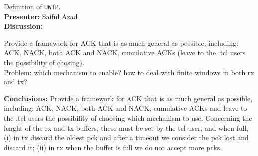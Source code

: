 \documentclass[11pt,journal,draftclsnofoot,onecolumn,twoside,letterpaper]{IEEEtran}
\theoremstyle{definition} \newtheorem{definition}[]{Definition}
\theoremstyle{theorem} \newtheorem{theorem}[]{Theorem}
\begin{document}
 Definition of {\tt UWTP}.\\
{\bf Presenter:} Saiful Azad\\
{\bf Discussion:} 
 
Provide a framework for ACK that is as much general as possible, including: ACK, NACK, both ACK and NACK, cumulative ACKs (leave to the .tcl users the possibility of chosing).\\
Problem: which mechanism to enable? how to deal with finite windows in both rx and tx?


{\bf Conclusions:}
Provide a framework for ACK that is as much general as possible, including: ACK, NACK, both ACK and NACK, cumulative ACKs and leave to the .tcl users the possibility of choosing which mechanism to use. Concerning the lenght of the rx and tx buffers, these must be set by the tcl-user, and  when full, (i) in tx discard the oldest pck and after a timeout we consider the pck lost and discard it; (ii) in rx when the buffer is full we do not accept more pcks. 
\end{document}
